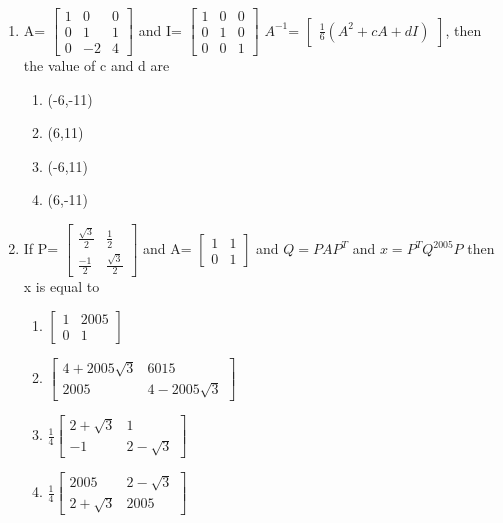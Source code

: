 \begin{enumerate}[label=\arabic*.,ref=\thesubsection.\theenumi]
\begin{enumerate}
\end{enumerate}
\item A= $\begin{bmatrix} 1 & 0 & 0  \\ 0 & 1 & 1 \\ 0 & -2 & 4 \end{bmatrix}$  and I= $\begin{bmatrix} 1 & 0 & 0  \\ 0 & 1 & 0 \\ 0 & 0 & 1 \end{bmatrix}$ $A^{-1}$= $\begin{bmatrix} \frac{1}{6}(A^2+cA+dI) \end{bmatrix}$, then the value of c and d are
\begin{enumerate}
 \item (-6,-11)
 \item (6,11)
 \item (-6,11)
 \item (6,-11)
\end{enumerate}
\item If P= $\begin{bmatrix} \frac{\sqrt3}{2} & \frac{1}{2}  \\ \frac{-1}{2} & \frac{\sqrt3}{2} \end{bmatrix}$ and A= $\begin{bmatrix} 1 & 1  \\ 0 & 1 \end{bmatrix}$ and $Q= PAP^T$ and $x=P^TQ^{2005} P$ then x is equal to 
\begin{enumerate}
\item $\begin{bmatrix} 1 & 2005  \\ 0 & 1 \end{bmatrix}$
\item $\begin{bmatrix} 4+2005\sqrt3 & 6015  \\ 2005 &  4-2005\sqrt3 \end{bmatrix}$
\item $\frac{1}{4} \begin{bmatrix} 2+\sqrt3 & 1  \\ -1 &  2-\sqrt3 \end{bmatrix}$
\item $\frac{1}{4} \begin{bmatrix} 2005 & 2-\sqrt3  \\ 2+\sqrt3 &  2005 \end{bmatrix}$
\end{enumerate}

\end{enumerate}
